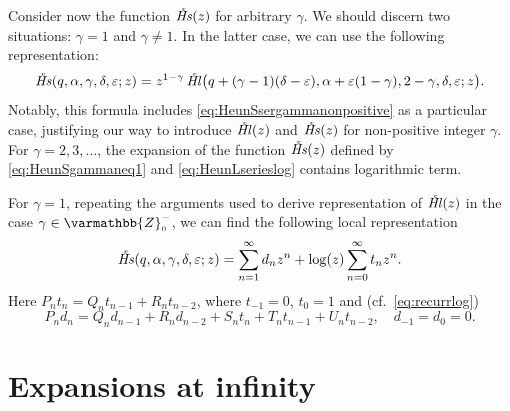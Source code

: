 \documentclass[11pt]{article}
\newcommand{\MF}[1]{\mathop{#1}\nolimits}
\newcommand{\Zzo}{\varmathbb{Z}_{\scriptscriptstyle0}^{-}}%
\def\HeunCl{\setbox0=\hbox{\tiny\itshape\bfseries \kern1.52mm c}\wd0=0pt\ht0=0pt\dp0=0pt\MF{\textit{\hbox{\raise1.67ex\copy0}Hl\/}}}%
\def\HeunCs{\setbox0=\hbox{\tiny\itshape\bfseries \kern1.52mm c}\wd0=0pt\ht0=0pt\dp0=0pt\MF{\textit{\hbox{\raise1.67ex\copy0}Hs\/}}}%
\begin{document}
Consider now the function $\HeunCs(z)$ for arbitrary $\gamma$. We
should discern two situations: $\gamma=1$ and $\gamma\neq1$. In the latter case, we can use the following representation:
\begin{equation}
 \HeunCs(q,\alpha,\gamma,\delta,\varepsilon;z) = z^{1-\gamma}
 \HeunCl\bigl(q+(\gamma-1)(\delta-\varepsilon),\alpha+\varepsilon(1-\gamma),2-\gamma,\delta,\varepsilon;z\bigr).
\label{eq:HeunSgammaneq1}
\end{equation}
Notably, this formula includes \eqref{eq:HeunSsergammanonpositive} as a
particular case, justifying our way to introduce $\HeunCl(z)$ and $\HeunCs(z)$ for
non-positive integer $\gamma$. For $\gamma=2,3,\ldots$,  the expansion of the function $\HeunCs(z)$ defined by \eqref{eq:HeunSgammaneq1} and \eqref{eq:HeunLserieslog} contains logarithmic term.

For $\gamma=1$, repeating the arguments used to derive representation of
$\HeunCl(z)$ in the case $\gamma\in\Zzo$, we can find the following local
representation
\begin{equation}
\HeunCs(q,\alpha,\gamma,\delta,\varepsilon;z)=\sum_{n=1}^{\infty}d_n z^n
+\log(z)\sum_{n=0}^{\infty}t_n z^n.
\label{eq:HeunSgamma=1ser}
\end{equation}
Here $P_n t_n=Q_n t_{n-1}+R_n t_{n-2}$, where $t_{-1}=0$, $t_{0}=1$ and (cf.\
\eqref{eq:recurrlog})
\begin{equation*}
P_n d_n=Q_n d_{n-1}+R_n d_{n-2}+ S_n t_{n}+T_n t_{n-1}+U_n t_{n-2},\quad
d_{-1}=d_0=0.
\end{equation*}

\section{Expansions at infinity}
\label{sect:expatinf}
\end{document}
